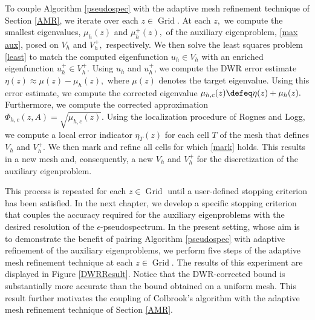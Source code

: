 


To couple Algorithm \ref{pseudospec} with the adaptive mesh refinement technique of Section \ref{AMR}, we iterate over each $z \in \operatorname{Grid}.$ At each $z,$ we compute the smallest eigenvalues, $\mu_h(z)$ and $\mu_h^+(z),$ of the auxiliary eigenproblem, \eqref{max aux}, posed on $V_h$ and $V_h^+,$ respectively. We then solve the least squares problem \eqref{least} to match the computed eigenfunction $u_h \in V_h$ with an enriched eigenfunction $u_h^+ \in V_h^+.$ Using $u_h$ and $u_h^+$, we compute the DWR error estimate $\eta(z) \approx \mu(z) - \mu_h(z),$ where $\mu(z)$ denotes the target eigenvalue. Using this error estimate, we compute the corrected eigenvalue $\mu_{h, c}(z) \defeq \eta(z) + \mu_h(z).$ Furthermore, we compute the corrected approximation $\Phi_{h,c}(z,A) = \sqrt{ \mu_{h,c}(z) }.$ 
Using the localization procedure of Rognes and Logg, we compute a local error indicator $\eta_T(z)$ for each cell $T$ of the mesh that defines $V_h$ and $V_h^+$. We then mark and refine all cells for which \eqref{mark} holds. This results in a new mesh and, consequently, a new $V_h$ and $V_h^+$ for the discretization of the auxiliary eigenproblem. 

This process is repeated for each $z \in \operatorname{Grid}$ until a user-defined stopping criterion has been satisfied. In the next chapter, we develop a specific stopping criterion that couples the accuracy required for the auxiliary eigenproblems with the desired resolution of the $\epsilon$-pseudospectrum. In the present setting, whose aim is to demonstrate the benefit of pairing Algorithm \ref{pseudospec} with adaptive refinement of the auxiliary eigenproblems, we perform five steps of the adaptive mesh refinement technique at each $z \in \operatorname{Grid}.$ The results of this experiment are displayed in Figure \ref{DWRResult}. Notice that the DWR-corrected bound is substantially more accurate than the bound obtained on a uniform mesh. This result further motivates the coupling of Colbrook's algorithm with the adaptive mesh refinement technique of Section \eqref{AMR}.


